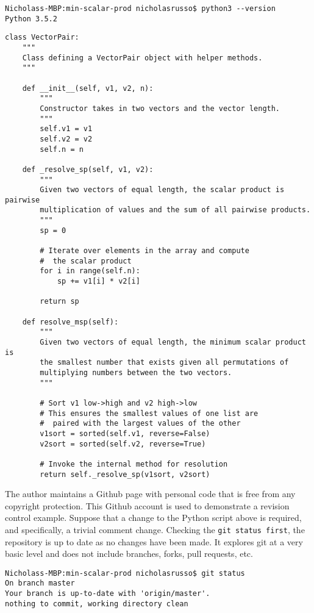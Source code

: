 \begin{verbatim}
Nicholass-MBP:min-scalar-prod nicholasrusso$ python3 --version
Python 3.5.2
\end{verbatim}

\begin{verbatim}
class VectorPair:
    """
	Class defining a VectorPair object with helper methods.
	"""

    def __init__(self, v1, v2, n):
        """
        Constructor takes in two vectors and the vector length.
        """
        self.v1 = v1
        self.v2 = v2
        self.n = n

    def _resolve_sp(self, v1, v2):
        """
        Given two vectors of equal length, the scalar product is pairwise
        multiplication of values and the sum of all pairwise products.
        """
        sp = 0

        # Iterate over elements in the array and compute
        #  the scalar product
        for i in range(self.n):
            sp += v1[i] * v2[i]

        return sp

    def resolve_msp(self):
        """
        Given two vectors of equal length, the minimum scalar product is
        the smallest number that exists given all permutations of
        multiplying numbers between the two vectors.
        """

        # Sort v1 low->high and v2 high->low
        # This ensures the smallest values of one list are
        #  paired with the largest values of the other
        v1sort = sorted(self.v1, reverse=False)
        v2sort = sorted(self.v2, reverse=True)

        # Invoke the internal method for resolution
        return self._resolve_sp(v1sort, v2sort)
\end{verbatim}

The author maintains a Github page with personal code that is free from any
copyright protection. This Github account is used to demonstrate a revision
control example. Suppose that a change to the Python script above is required,
and specifically, a trivial comment change. Checking the \verb|git status first|,
the repository is up to date as no changes have been made. It explores git at
a very basic level and does not include branches, forks, pull requests, etc.

\begin{verbatim}
Nicholass-MBP:min-scalar-prod nicholasrusso$ git status
On branch master
Your branch is up-to-date with 'origin/master'.
nothing to commit, working directory clean
\end{verbatim}

